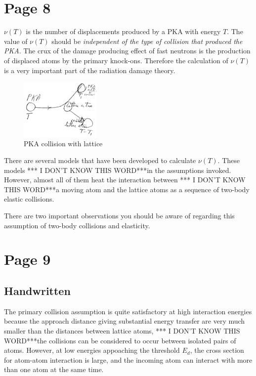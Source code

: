 \documentclass[11pt]{article}
\newcommand{\IDK}{*** I DON'T KNOW THIS WORD***}
\begin{document}
\section{Page 8}
$\nu(T)$ is the number of displacements produced by a PKA with energy $T$. The value of $\nu(T)$ should be \textit{independent of the type of collision that produced the PKA}. The crux of the damage producing effect of fast neutrons is the production of displaced atoms by the primary knock-ons. Therefore the calculation of $\nu(T)$ is a very important part of the radiation damage theory.

\begin{figure}
  \begin{center}
  \includegraphics[width=0.35\textwidth]{figs/fig3.png}
  \end{center}
  \caption{PKA collision with lattice}
\end{figure}

There are several models that have been developed to calculate $\nu(T)$. These models \IDK in the assumptions invoked. However, almost all of them heat the interaction between \IDK a moving atom and the lattice atoms as a sequence of two-body elastic collisions.

There are two important observations you should be aware of regarding this assumption of two-body collisions and elasticity.

\section{Page 9}
\subsection{Handwritten}
The primary collision assumption is quite satisfactory at high interaction energies because the approach distance giving substantial energy transfer are very much smaller than the distances between lattice atoms, \IDK the collisions can be considered to occur between isolated pairs of atoms. However, at low energies appoaching the threshold $E_d$, the cross section for atom-atom interaction is large, and the incoming atom can interact with more than one atom at the same time.
\end{document}
